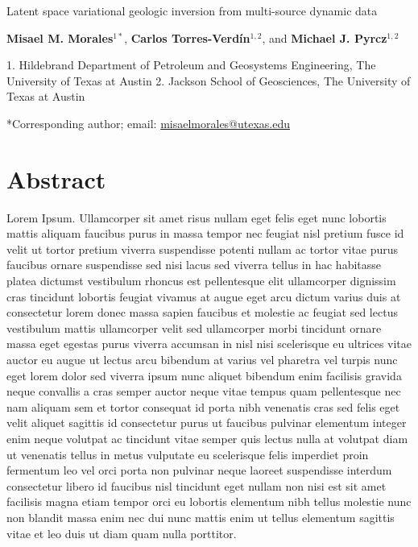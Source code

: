 \documentclass[10pt, twoside]{article}
\begin{document}
\doublespacing

\begin{center}
    {\huge Latent space variational geologic inversion from multi-source dynamic data}
    \vspace{5mm}
    
    \textbf{Misael M. Morales$^{1*}$}, 
    \textbf{Carlos Torres-Verd\'in$^{1,2}$}, and 
    \textbf{Michael J. Pyrcz$^{1,2}$}
\end{center}

\begin{flushleft}
    1. Hildebrand Department of Petroleum and Geosystems Engineering, The University of Texas at Austin
    2. Jackson School of Geosciences, The University of Texas at Austin
    
    *Corresponding author; email: \url{misaelmorales@utexas.edu}
\end{flushleft}

\section*{\textbf{Abstract}}
Lorem Ipsum. Ullamcorper sit amet risus nullam eget felis eget nunc lobortis mattis aliquam faucibus purus in massa tempor nec feugiat nisl pretium fusce id velit ut tortor pretium viverra suspendisse potenti nullam ac tortor vitae purus faucibus ornare suspendisse sed nisi lacus sed viverra tellus in hac habitasse platea dictumst vestibulum rhoncus est pellentesque elit ullamcorper dignissim cras tincidunt lobortis feugiat vivamus at augue eget arcu dictum varius duis at consectetur lorem donec massa sapien faucibus et molestie ac feugiat sed lectus vestibulum mattis ullamcorper velit sed ullamcorper morbi tincidunt ornare massa eget egestas purus viverra accumsan in nisl nisi scelerisque eu ultrices vitae auctor eu augue ut lectus arcu bibendum at varius vel pharetra vel turpis nunc eget lorem dolor sed viverra ipsum nunc aliquet bibendum enim facilisis gravida neque convallis a cras semper auctor neque vitae tempus quam pellentesque nec nam aliquam sem et tortor consequat id porta nibh venenatis cras sed felis eget velit aliquet sagittis id consectetur purus ut faucibus pulvinar elementum integer enim neque volutpat ac tincidunt vitae semper quis lectus nulla at volutpat diam ut venenatis tellus in metus vulputate eu scelerisque felis imperdiet proin fermentum leo vel orci porta non pulvinar neque laoreet suspendisse interdum consectetur libero id faucibus nisl tincidunt eget nullam non nisi est sit amet facilisis magna etiam tempor orci eu lobortis elementum nibh tellus molestie nunc non blandit massa enim nec dui nunc mattis enim ut tellus elementum sagittis vitae et leo duis ut diam quam nulla porttitor.
\end{document}
